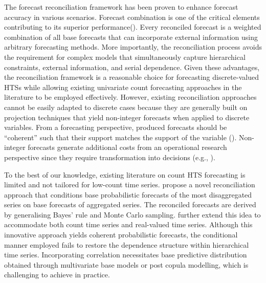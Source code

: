 \documentclass[a4paper,review,12pt,authoryear]{elsarticle}
\begin{document}
The forecast reconciliation framework has been proven to enhance forecast accuracy in various scenarios. 
Forecast combination is one of the critical elements contributing to its superior performance(\citealp{hollymanUnderstandingForecastReconciliation2021}). 
Every reconciled forecast is a weighted combination of all base forecasts that
can incorporate external information using arbitrary forecasting methods.
More importantly, the reconciliation process avoids the requirement for complex models that  simultaneously capture hierarchical constraints, external information, and serial dependence.
Given these advantages, the reconciliation framework is a reasonable choice for forecasting discrete-valued HTSs while allowing existing univariate count forecasting approaches in the literature to be employed effectively.
However, existing reconciliation approaches cannot be easily adapted to discrete cases because they are generally built on projection techniques that yield non-integer forecasts when applied to discrete variables.
From a forecasting perspective, produced forecasts should be ``coherent'' such that their support matches the support of the variable (\citealp{freelandForecastingDiscreteValued2004}). 
Non-integer forecasts generate additional costs from an operational research perspective since they require transformation into decisions (e.g., \citealp{goltsosInventoryForecastingMind2022}).

To the best of our knowledge, existing literature on count HTS forecasting is limited and not tailored for low-count time series.
\cite{coraniProbabilisticReconciliationCount2022} propose a novel reconciliation approach that conditions base probabilistic forecasts of the most disaggregated series on base forecasts of aggregated series. 
The reconciled forecasts are derived by generalising Bayes’ rule and Monte Carlo sampling.
\cite{zambonEfficientProbabilisticReconciliation2022} further extend this idea to accommodate both count time series and real-valued time series.
Although this innovative approach yields coherent probabilistic forecasts, 
the conditional manner employed fails to restore the dependence structure within hierarchical time series.
Incorporating correlation necessitates base predictive distribution obtained through multivariate base models or post copula modelling, which is challenging to achieve in practice.
\end{document}
